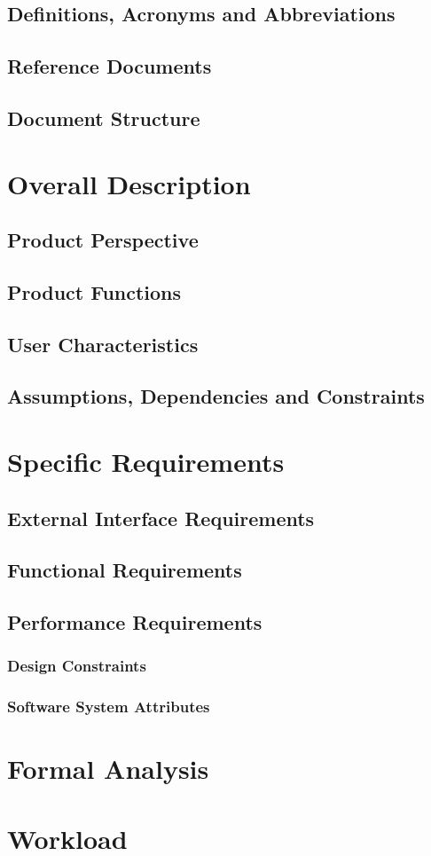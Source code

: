 \documentclass[a4paper, oneside]{book}
\begin{document}
\section{Definitions, Acronyms and Abbreviations}
\section{Reference Documents}
\section{Document Structure}

\chapter{Overall Description}
\section{Product Perspective}
\section{Product Functions}
\section{User Characteristics}
\section{Assumptions, Dependencies and Constraints}

\chapter{Specific Requirements}
\section{External Interface Requirements}
\section{Functional Requirements}
\section{Performance Requirements}
\subsection{Design Constraints}
\subsection{Software System Attributes}

\chapter{Formal Analysis}

\chapter{Workload}

\end{document}
